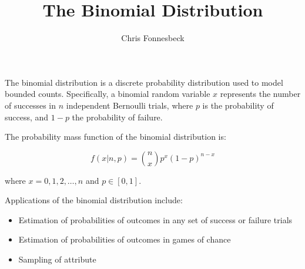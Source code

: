 \documentclass[11pt]{article}  %
\title{The Binomial Distribution}
\author{Chris Fonnesbeck}
\begin{document}
	
\maketitle %

The binomial distribution is a discrete probability distribution used to
model bounded counts. Specifically, a binomial random variable $x$ represents
the number of successes in $n$ independent Bernoulli trials, where $p$ is
the probability of success, and $1-p$ the probability of failure.


The probability mass function of the binomial distribution is:

\begin{equation}
	f(x | n,p) = {n \choose x} p^x (1-p)^{n-x} %
\end{equation}

\noindent where $x = 0,1,2,\ldots,n$ and $p \in [0,1]$.

Applications of the binomial distribution include:

\begin{itemize} %

	\item Estimation of probabilities of outcomes in any set of success or failure trials

	\item Estimation of probabilities of outcomes in games of chance

	\item Sampling of attribute

\end{itemize}
\end{document}
